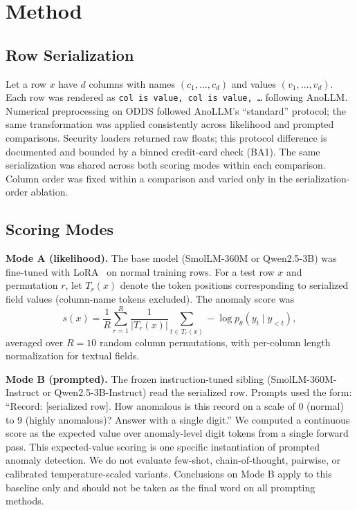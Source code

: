 \documentclass[conference]{IEEEtran}
\begin{document}
\section{Method}\label{sec:method}

\subsection{Row Serialization}
Let a row $x$ have $d$ columns with names $(c_1,\ldots,c_d)$ and values $(v_1,\ldots,v_d)$.
Each row was rendered as \texttt{col is value, col is value, \ldots} following AnoLLM.
Numerical preprocessing on ODDS followed AnoLLM's ``standard'' protocol; the same transformation was applied consistently across likelihood and prompted comparisons.
Security loaders returned raw floats; this protocol difference is documented and bounded by a binned credit-card check (BA1).
The same serialization was shared across both scoring modes within each comparison.
Column order was fixed within a comparison and varied only in the serialization-order ablation.

\subsection{Scoring Modes}
\textbf{Mode A (likelihood).}
The base model (SmolLM-360M or Qwen2.5-3B) was fine-tuned with LoRA~\cite{hu2022lora} on normal training rows.
For a test row $x$ and permutation $r$, let $T_r(x)$ denote the token positions corresponding to serialized field values (column-name tokens excluded).
The anomaly score was
\begin{equation}
s(x)=\frac{1}{R}\sum_{r=1}^{R}\frac{1}{|T_r(x)|}\sum_{t\in T_r(x)}-\log p_\theta(y_t \mid y_{<t}),
\end{equation}
averaged over $R=10$ random column permutations, with per-column length normalization for textual fields.

\textbf{Mode B (prompted).}
The frozen instruction-tuned sibling (SmolLM-360M-Instruct or Qwen2.5-3B-Instruct) read the serialized row.
Prompts used the form: ``Record: [serialized row]. How anomalous is this record on a scale of 0 (normal) to 9 (highly anomalous)? Answer with a single digit.''
We computed a continuous score as the expected value over anomaly-level digit tokens from a single forward pass.
This expected-value scoring is one specific instantiation of prompted anomaly detection.
We do not evaluate few-shot, chain-of-thought, pairwise, or calibrated temperature-scaled variants. Conclusions on Mode B apply to this baseline only and should not be taken as the final word on all prompting methods.
\end{document}
